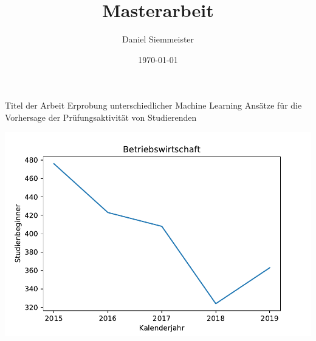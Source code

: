 \documentclass[17pt]{beamer}
\title[]{Masterarbeit}
\author[]{Daniel Siemmeister}
\date[\today]{\today}
\begin{document}
\begin{frame}[plain]
    \titlepage    
\end{frame}

\begin{frame}{Titel der Arbeit}
\centering
Erprobung unterschiedlicher Machine Learning Ansätze für die Vorhersage der Prüfungsaktivität von Studierenden
\end{frame}

\begin{frame}
    \includegraphics[scale=0.6]{bwl3.pdf}
\end{frame}
\end{document}
